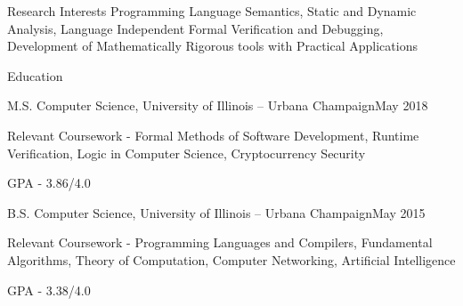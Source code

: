 \documentclass{resume} %
\begin{document}
 
 \begin{rSection}{Research Interests}
  Programming Language Semantics, Static and Dynamic Analysis, Language Independent Formal Verification and Debugging,
  Development of Mathematically Rigorous tools with Practical Applications
 \end{rSection}
\begin{rSection}{Education}
\begin{rSubsection}{ M.S. Computer Science, University of Illinois -- Urbana Champaign}{May 2018}{}{}
\item Relevant Coursework - Formal Methods of Software Development, Runtime Verification, Logic in Computer Science, Cryptocurrency Security 
\item GPA - 3.86/4.0
\end{rSubsection}
\begin{rSubsection}{ B.S. Computer Science, University of Illinois -- Urbana Champaign}{May 2015}{}{}
\item Relevant Coursework - Programming Languages and Compilers, Fundamental Algorithms, Theory of Computation, Computer Networking, Artificial Intelligence
\item GPA - 3.38/4.0
\end{rSubsection}
\end{rSection}
\end{document}
